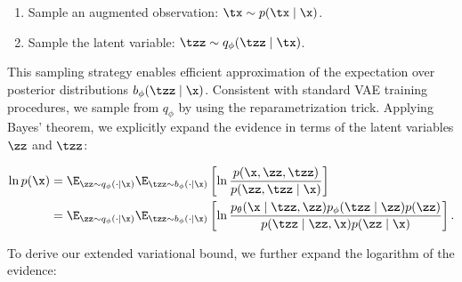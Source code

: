 \begin{enumerate}
    \item Sample an augmented observation: $\tx \sim p(\tx \mid \x)$.
    \item Sample the latent variable: $\tzz \sim q_{\phi}(\tzz \mid \tx)$.
\end{enumerate}

This sampling strategy enables efficient approximation of the expectation over posterior distributions $b_{\phi}(\tzz \mid \x)$. Consistent with standard VAE training procedures, we sample from $q_{\phi}$ by using the reparametrization trick. Applying Bayes' theorem, we explicitly expand the evidence in terms of the latent variables $\zz$ and $\tzz$:


\begin{equation}
    \begin{split}
        \ln{p(\x)}
        & =
        \E_{\zz \sim q_{\phi}(\cdot \mid \x)} \E_{\tzz \sim b_{\phi}(\cdot \mid \x)}
        \left[
            \ln \frac{p(\x, \zz, \tzz)}{p(\zz, \tzz \mid \x)}
            \right] \\
        & =
        \E_{\zz \sim q_{\phi}(\cdot \mid \x)} \E_{\tzz \sim b_{\phi}(\cdot \mid \x)}
        \left[
            \ln \frac{p_{\theta}(\x \mid \tzz, \zz) p_{\phi}(\tzz \mid \zz) p(\zz)}{p(\tzz \mid \zz, \x) p(\zz \mid \x)}
            \right].
    \end{split}
\end{equation}


To derive our extended variational bound, we further expand the logarithm of the evidence:

